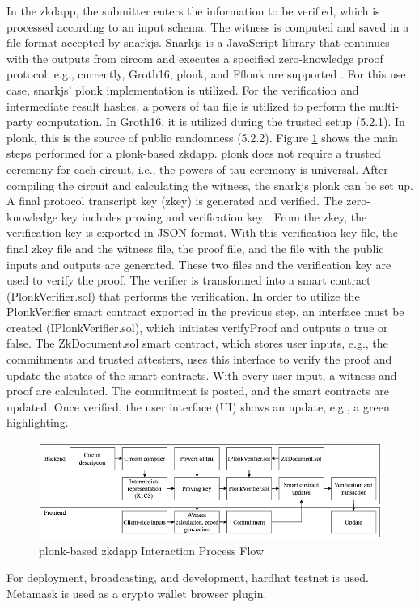 In the \acrshort{zkdapp}, the submitter enters the information to be verified, which is processed according to an input schema. The witness is computed and saved in a file format accepted by snarkjs. Snarkjs is a JavaScript library that continues with the outputs from circom and executes a specified zero-knowledge proof protocol, e.g., currently, Groth16, \acrshort{plonk}, and Fflonk are supported \citep{snarkjsdoc}. For this use case, snarkjs' \acrshort{plonk} implementation is utilized. For the verification and intermediate result hashes, a powers of tau file is utilized to perform the multi-party computation. In Groth16, it is utilized during the trusted setup (5.2.1). In \acrshort{plonk}, this is the source of public randomness (5.2.2). Figure \ref{fig:zk-DAppgeneral} shows the main steps performed for a \acrshort{plonk}-based \acrshort{zkdapp}. \acrshort{plonk} does not require a trusted ceremony for each circuit, i.e., the powers of tau ceremony is universal. After compiling the circuit and calculating the witness, the snarkjs \acrshort{plonk} can be set up. A final protocol transcript key (zkey) is generated and verified. The zero-knowledge key includes proving and verification key \citep{snarkjsdoc}. From the zkey, the verification key is exported in JSON format. With this verification key file, the final zkey file and the witness file, the proof file, and the file with the public inputs and outputs are generated. These two files and the verification key are used to verify the proof. The verifier is transformed into a smart contract (PlonkVerifier.sol) that performs the verification. In order to utilize the PlonkVerifier smart contract exported in the previous step, an interface must be created (IPlonkVerifier.sol), which initiates verifyProof and outputs a true or false. The ZkDocument.sol smart contract, which stores user inputs, e.g., the commitments and trusted attesters, uses this interface to verify the proof and update the states of the smart contracts. With every user input, a witness and proof are calculated. The commitment is posted, and the smart contracts are updated. Once verified, the user interface (UI) shows an update, e.g., a green highlighting. 
\begin{figure}[hbt]
	\centering
		\includegraphics[width=1.0\textwidth]{Pictures/circom snarkjs process flow.png}
	\caption{\acrshort{plonk}-based \acrshort{zkdapp} Interaction Process Flow}
	\label{fig:zk-DAppgeneral}
\end{figure}
For deployment, broadcasting, and development, hardhat testnet is used. Metamask is used as a crypto wallet browser plugin.

